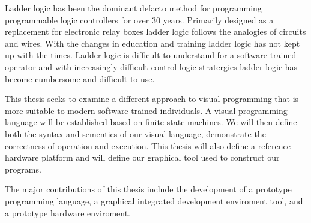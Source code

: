 
Ladder logic has been the dominant defacto method for programming programmable logic controllers for over 30 years. Primarily designed as a replacement for electronic relay boxes ladder logic follows the analogies of circuits and wires. With the changes in education and training ladder logic has not kept up with the times. Ladder logic is difficult to understand for a software trained operator and with increasingly difficult control logic stratergies ladder logic has become cumbersome and difficult to use.

This thesis seeks to examine a different approach to visual programming that is more suitable to modern software trained individuals. A visual programming language will be established based on finite state machines. We will then define both the syntax and sementics of our visual language, demonstrate the correctness of operation and execution. This thesis will also define a reference hardware platform and will define our graphical tool used to construct our programs.

The major contributions of this thesis include the development of a prototype programming language, a graphical integrated development enviroment tool, and a prototype hardware enviroment.